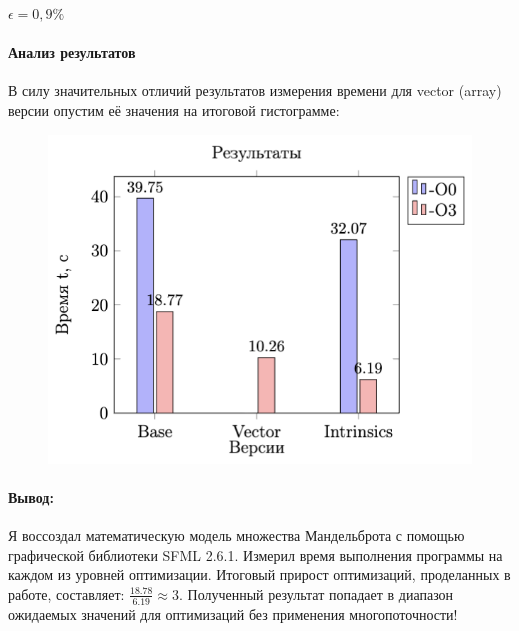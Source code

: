 \documentclass[12pt, letterpaper]{article}
\begin{document}
    $\epsilon = 0,9\%$\\

    \paragraph{Анализ результатов}

    В силу значительных отличий результатов измерения времени для vector (array) версии опустим её значения на итоговой гистограмме:

    \begin{figure}[h]
        \centering
        \includegraphics[width=0.7\linewidth]{../data/imgs/results.png}
        \label{fig:enter-label}
    \end{figure}

    \paragraph{Вывод:}
    Я воссоздал математическую модель множества Мандельброта с помощью графической библиотеки SFML 2.6.1. Измерил время выполнения программы на каждом из уровней оптимизации. Итоговый прирост оптимизаций, проделанных в работе, составляет: $\frac{18.78}{6.19} \approx 3$. Полученный результат попадает в диапазон ожидаемых значений для оптимизаций без применения многопоточности!
\end{document}
